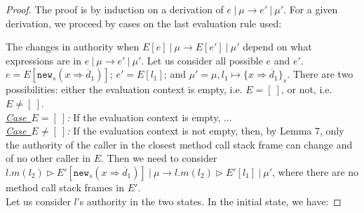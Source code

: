 \documentclass{llncs}
\newcommand{\keywadj}[1]{\mathtt{#1}}
\begin{document}
\begin{proof} The proof is by induction on a derivation of $e~|~\mu \longrightarrow e'~|~\mu'$. For a given derivation, we proceed by cases on the last evaluation rule used:\\

\sloppy 

\noindent{} The changes in authority when $E[e]~|~\mu \longrightarrow E[e']~|~\mu'$ depend on what expressions are in $e~|~\mu \longrightarrow e'~|~\mu'$. Let us consider all possible $e$ and $e'$.\\

\noindent{}
$e = E[\keywadj{new}_s(x \Rightarrow \overline{d}_1)]$; $e' = E[l_1]$; and $\mu' = \mu, l_1 \mapsto \{ x \Rightarrow \overline{d}_1 \}_s$. There are two possibilities: either the evaluation context is empty, i.e. $E = [~]$, or not, i.e. $E \not= [~]$.\\

\noindent\textit{\mbox{\underline{Case $E = [~]$}}:} If the evaluation context is empty, ...\\

\noindent\textit{\mbox{\underline{Case $E \not= [~]$}}:} If the evaluation context is not empty, then, by Lemma 7, only the authority of the caller in the closest method call stack frame can change and of no other caller in $E$. Then we need to consider
%
\mbox{$l.m(l_2) \rhd E'[\keywadj{new}_s(x \Rightarrow \overline{d}_1)]~|~\mu \longrightarrow l.m(l_2) \rhd E'[l_1]~|~\mu'$}, where there are no method call stack frames in $E'$.\\

\noindent Let us consider $l$'s authority in the two states. In the initial state, we have:


\end{proof}
\end{document}
